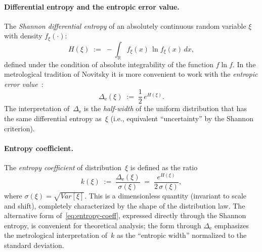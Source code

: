 \documentclass[11pt]{article}
\def\mathrm#1{#1}%
\theoremstyle{definition}
\newcommand{\Var}{\mathrm{Var}}
\begin{document}
\paragraph{Differential entropy and the entropic error value.}
The \emph{Shannon differential entropy} of an absolutely continuous random
variable $\xi$ with density $f_{\xi}(\cdot)$:
\begin{equation}\label{eq:shannon-entropy}
  H(\xi) \;:=\; -\int_{\mathbb{R}} f_{\xi}(x)\,\ln f_{\xi}(x)\,dx,
\end{equation}
defined under the condition of absolute integrability of the function
$f \ln f$. In the metrological tradition of Novitsky it is more convenient
to work with the \emph{entropic error value}~\citep[ch.~3.4]{novitsky1991errors}:
\begin{equation}\label{eq:entropic-error}
  \Delta_{\text{e}}(\xi) \;:=\; \frac{1}{2}\,e^{H(\xi)}.
\end{equation}
The interpretation of~$\Delta_{\text{e}}$ is the \emph{half-width} of the
uniform distribution that has the same differential entropy as~$\xi$ (i.e.,
equivalent ``uncertainty'' by the Shannon criterion).

\paragraph{Entropy coefficient.}
The \emph{entropy coefficient} of distribution~$\xi$ is defined as the ratio
\begin{equation}\label{eq:entropy-coeff}
  k(\xi)
  \;:=\; \frac{\Delta_{\text{e}}(\xi)}{\sigma(\xi)}
  \;=\; \frac{e^{H(\xi)}}{2\,\sigma(\xi)},
\end{equation}
where $\sigma(\xi) = \sqrt{\Var[\xi]}$. This is a dimensionless quantity
(invariant to scale and shift), completely characterized by the shape of the
distribution law. The alternative form of~\eqref{eq:entropy-coeff}, expressed
directly through the Shannon entropy, is convenient for theoretical analysis;
the form through $\Delta_{\text{e}}$ emphasizes the metrological
interpretation of~$k$ as the ``entropic width'' normalized to the standard
deviation.
\end{document}

